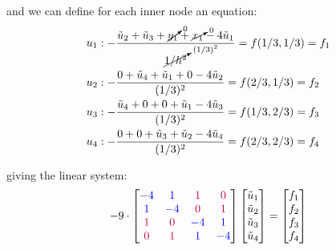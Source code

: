 and we can define for each inner node an equation:
\begin{align*}
	u_1 & : -\frac{\tilde{u}_2 + \tilde{u}_3 + \cancelto{0}{y_1} + \cancelto{0}{x_1} - 4\tilde{u}_1}{\cancelto{(1/3)^2}{1/h^2}} = f(1/3, 1/3) = f_1 \\
	u_2 & : -\frac{0 + \tilde{u}_4 + \tilde{u}_1 + 0 - 4\tilde{u}_2}{(1/3)^2} = f(2/3, 1/3) = f_2 \\
	u_3 & : -\frac{\tilde{u}_4 + 0 + 0 + \tilde{u}_1 - 4\tilde{u}_3}{(1/3)^2} = f(1/3, 2/3) = f_3 \\
	u_4 & : -\frac{0 + 0 + \tilde{u}_3 + \tilde{u}_2 - 4\tilde{u}_4}{(1/3)^2} = f(2/3, 2/3) = f_4 \\
\end{align*}

giving the linear system:
\begin{align*}
	-9\cdot\begin{bmatrix}
		{\color{blue}-4} & {\color{blue}1} & {\color{purple}1} & {\color{purple}0} \\
		{\color{blue}1} & {\color{blue}-4} & {\color{purple}0} & {\color{purple}1} \\
		{\color{purple}1} & {\color{purple}0} & {\color{blue}-4} & {\color{blue}1} \\
		{\color{purple}0} & {\color{purple}1} & {\color{blue}1} & {\color{blue}-4}
	\end{bmatrix}
	\begin{bmatrix}
		\tilde{u}_1 \\
		\tilde{u}_2 \\
		\tilde{u}_3 \\
		\tilde{u}_4
	\end{bmatrix}
	=
	\begin{bmatrix}
		f_1 \\
		f_2 \\
		f_3 \\
		f_4
	\end{bmatrix}
\end{align*}
